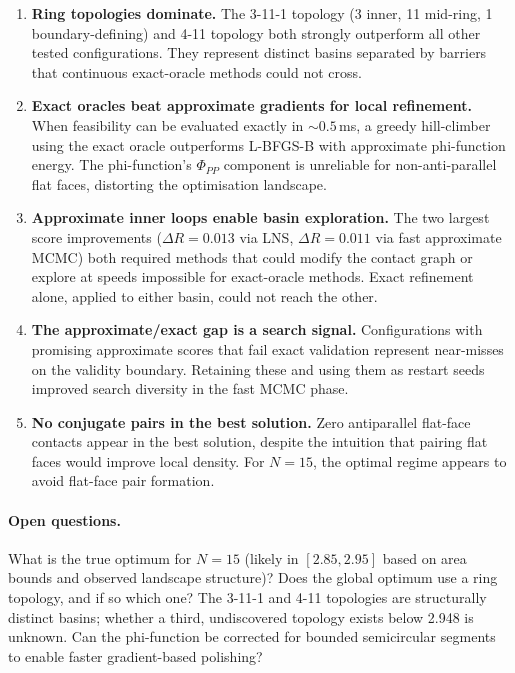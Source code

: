 \documentclass[11pt]{article}
\begin{document}
\begin{enumerate}
  \item \textbf{Ring topologies dominate.} The 3-11-1 topology (3 inner, 11 mid-ring, 1 boundary-defining) and 4-11 topology both strongly outperform all other tested configurations. They represent distinct basins separated by barriers that continuous exact-oracle methods could not cross.

  \item \textbf{Exact oracles beat approximate gradients for local refinement.} When feasibility can be evaluated exactly in ${\sim}0.5$\,ms, a greedy hill-climber using the exact oracle outperforms L-BFGS-B with approximate phi-function energy. The phi-function's $\Phi_{PP}$ component is unreliable for non-anti-parallel flat faces, distorting the optimisation landscape.

  \item \textbf{Approximate inner loops enable basin exploration.} The two largest score improvements ($\Delta R = 0.013$ via LNS, $\Delta R = 0.011$ via fast approximate MCMC) both required methods that could modify the contact graph or explore at speeds impossible for exact-oracle methods. Exact refinement alone, applied to either basin, could not reach the other.

  \item \textbf{The approximate/exact gap is a search signal.} Configurations with promising approximate scores that fail exact validation represent near-misses on the validity boundary. Retaining these and using them as restart seeds improved search diversity in the fast MCMC phase.

  \item \textbf{No conjugate pairs in the best solution.} Zero antiparallel flat-face contacts appear in the best solution, despite the intuition that pairing flat faces would improve local density. For $N = 15$, the optimal regime appears to avoid flat-face pair formation.
\end{enumerate}

\paragraph{Open questions.}
What is the true optimum for $N = 15$ (likely in $[2.85, 2.95]$ based on area bounds and observed landscape structure)? Does the global optimum use a ring topology, and if so which one? The 3-11-1 and 4-11 topologies are structurally distinct basins; whether a third, undiscovered topology exists below 2.948 is unknown. Can the phi-function be corrected for bounded semicircular segments to enable faster gradient-based polishing?
\end{document}
